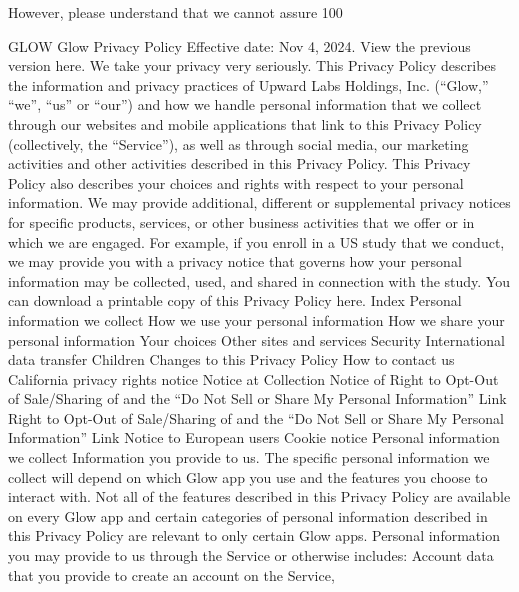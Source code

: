However, please understand that we cannot assure 100%

GLOW
Glow Privacy Policy
Effective date: Nov 4, 2024. View the previous version here.
We take your privacy very seriously. This Privacy Policy describes the
information and privacy practices of Upward Labs Holdings, Inc.
(“Glow,” “we”, “us” or “our”) and how we handle personal information
that we collect through our websites and mobile applications that link to
this Privacy Policy (collectively, the “Service”), as well as through social
media, our marketing activities and other activities described in this
Privacy Policy. This Privacy Policy also describes your choices and
rights with respect to your personal information.
We may provide additional, different or supplemental privacy notices for
specific products, services, or other business activities that we offer or
in which we are engaged. For example, if you enroll in a US study that
we conduct, we may provide you with a privacy notice that governs how
your personal information may be collected, used, and shared in
connection with the study.
You can download a printable copy of this Privacy Policy here.
Index
Personal information we collect
How we use your personal information
How we share your personal information
Your choices
Other sites and services
Security
International data transfer
Children
Changes to this Privacy Policy
How to contact us
California privacy rights notice
Notice at Collection
Notice of Right to Opt-Out of Sale/Sharing of and the “Do Not Sell or
Share My Personal Information” Link
Right to Opt-Out of Sale/Sharing of and the “Do Not Sell or Share My
Personal Information” Link
Notice to European users
Cookie notice
Personal information we collect
Information you provide to us. The specific personal information we
collect will depend on which Glow app you use and the features you
choose to interact with. Not all of the features described in this Privacy
Policy are available on every Glow app and certain categories of
personal information described in this Privacy Policy are relevant to only
certain Glow apps. Personal information you may provide to us through
the Service or otherwise includes:
Account data that you provide to create an account on the Service,
